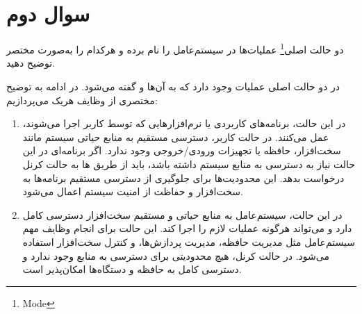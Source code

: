 \section{سوال دوم}
دو حالت اصلی\footnote{Mode} عملیات‌ها در سیستم‌عامل را نام برده و هرکدام را به‌صورت مختصر توضیح دهید.

\begin{qsolve}
	در  دو حالت اصلی عملیات وجود دارد که به آن‌ها  و  گفته می‌شود. در ادامه به توضیح مختصری از وظایف هریک می‌پردازیم:
	
	\begin{enumerate}
		\item 
		در این حالت، برنامه‌های کاربردی یا نرم‌افزارهایی که توسط کاربر اجرا می‌شوند، عمل می‌کنند. در حالت کاربر، دسترسی مستقیم به منابع حیاتی سیستم مانند سخت‌افزار، حافظه یا تجهیزات ورودی/خروجی وجود ندارد. اگر برنامه‌ای در این حالت نیاز به دسترسی به منابع سیستم داشته باشد، باید از طریق  ها به حالت کرنل درخواست بدهد. این محدودیت‌ها برای جلوگیری از دسترسی مستقیم برنامه‌ها به سخت‌افزار و حفاظت از امنیت سیستم اعمال می‌شود.
		
		\item 
		در این حالت، سیستم‌عامل به منابع حیاتی و مستقیم سخت‌افزار دسترسی کامل دارد و می‌تواند هرگونه عملیات لازم را اجرا کند. این حالت برای انجام وظایف مهم سیستم‌عامل مثل مدیریت حافظه، مدیریت پردازش‌ها، و کنترل سخت‌افزار استفاده می‌شود. در حالت کرنل، هیچ محدودیتی برای دسترسی به منابع وجود ندارد و دسترسی کامل به حافظه و دستگاه‌ها امکان‌پذیر است.
	\end{enumerate}
	
\end{qsolve}